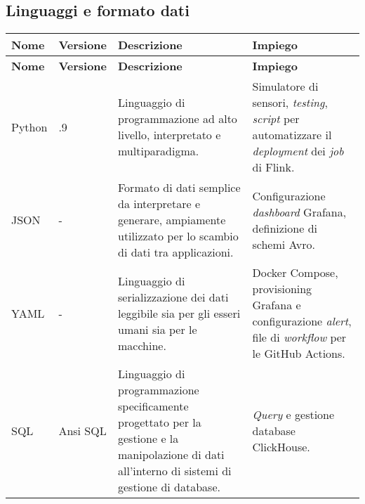 \subsection{Linguaggi e formato dati}
\begin{longtable}{|>{\centering\arraybackslash}m{}|>{\centering\arraybackslash}m{}|>{\centering\arraybackslash}m{}|>{\centering\arraybackslash}m{}|}
	\hline
	\textbf{Nome} & \textbf{Versione} & \textbf{Descrizione}                                                                                                                                 & \textbf{Impiego}                                                                                                             \\\hline
	\endfirsthead
	\hline
	\textbf{Nome} & \textbf{Versione} & \textbf{Descrizione}                                                                                                                                 & \textbf{Impiego}                                                                                                             \\\hline
	\endhead
	Python        & 3.11.9            & Linguaggio di programmazione ad alto livello, interpretato e multiparadigma.                                                                         & Simulatore di sensori, \textit{testing}, \textit{script} per automatizzare il \textit{deployment} dei \textit{job} di Flink. \\\hline
	JSON          & -                 & Formato di dati semplice da interpretare e generare, ampiamente utilizzato per lo scambio di dati tra applicazioni.                                  & Configurazione \textit{dashboard} Grafana, definizione di schemi Avro.                                                       \\\hline
	YAML          & -                 & Linguaggio di serializzazione dei dati leggibile sia per gli esseri umani sia per le macchine.                                                       & Docker Compose, provisioning Grafana e configurazione \textit{alert}, file di \textit{workflow} per le GitHub Actions.       \\\hline
	SQL           & Ansi SQL          & Linguaggio di programmazione specificamente progettato per la gestione e la manipolazione di dati all'interno di sistemi di gestione di database.    & \textit{Query} e gestione database ClickHouse.                                                                               \\\hline

\end{longtable}
